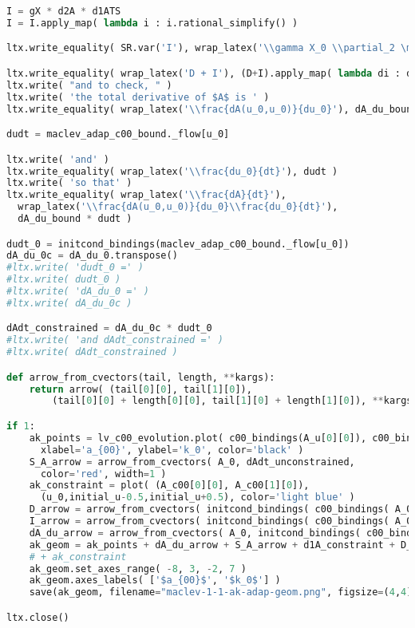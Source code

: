 \begin{lstlisting}[language=Python]
I = gX * d2A * d1ATS
I = I.apply_map( lambda i : i.rational_simplify() )

ltx.write_equality( SR.var('I'), wrap_latex('\\gamma X_0 \\partial_2 \mathbf A \\partial_1 \mathbf A^T S(\\mathbf A)'), I )

ltx.write_equality( wrap_latex('D + I'), (D+I).apply_map( lambda di : di.rational_simplify() ) )
ltx.write( "and to check, " )
ltx.write( 'the total derivative of $A$ is ' )
ltx.write_equality( wrap_latex('\\frac{dA(u_0,u_0)}{du_0}'), dA_du_bound )

dudt = maclev_adap_c00_bound._flow[u_0]

ltx.write( 'and' )
ltx.write_equality( wrap_latex('\\frac{du_0}{dt}'), dudt )
ltx.write( 'so that' )
ltx.write_equality( wrap_latex('\\frac{dA}{dt}'),
  wrap_latex('\\frac{dA(u_0,u_0)}{du_0}\\frac{du_0}{dt}'),
  dA_du_bound * dudt )

dudt_0 = initcond_bindings(maclev_adap_c00_bound._flow[u_0])
dA_du_0c = dA_du_0.transpose()
#ltx.write( 'dudt_0 =' )
#ltx.write( dudt_0 )
#ltx.write( 'dA_du_0 =' )
#ltx.write( dA_du_0c )

dAdt_constrained = dA_du_0c * dudt_0
#ltx.write( 'and dAdt_constrained =' )
#ltx.write( dAdt_constrained )

def arrow_from_cvectors(tail, length, **kargs):
    return arrow( (tail[0][0], tail[1][0]),
        (tail[0][0] + length[0][0], tail[1][0] + length[1][0]), **kargs)

if 1:
    ak_points = lv_c00_evolution.plot( c00_bindings(A_u[0][0]), c00_bindings(A_u[1][0]),
      xlabel='a_{00}', ylabel='k_0', color='black' )
    S_A_arrow = arrow_from_cvectors( A_0, dAdt_unconstrained,
      color='red', width=1 )
    ak_constraint = plot( (A_c00[0][0], A_c00[1][0]),
      (u_0,initial_u-0.5,initial_u+0.5), color='light blue' )
    D_arrow = arrow_from_cvectors( initcond_bindings( c00_bindings( A_0 ) ), initcond_bindings( c00_bindings( D ) ), color='green', width=1 )
    I_arrow = arrow_from_cvectors( initcond_bindings( c00_bindings( A_0 + D ) ), initcond_bindings( c00_bindings( I ) ), color='purple', width=1 )
    dA_du_arrow = arrow_from_cvectors( A_0, initcond_bindings( c00_bindings( dA_du_bound * dudt ) ), color='blue', width=1 )
    ak_geom = ak_points + dA_du_arrow + S_A_arrow + d1A_constraint + D_arrow + I_arrow
    # + ak_constraint
    ak_geom.set_axes_range( -8, 3, -2, 7 )
    ak_geom.axes_labels( ['$a_{00}$', '$k_0$'] )
    save(ak_geom, filename="maclev-1-1-ak-adap-geom.png", figsize=(4,4))

ltx.close()

\end{lstlisting}
